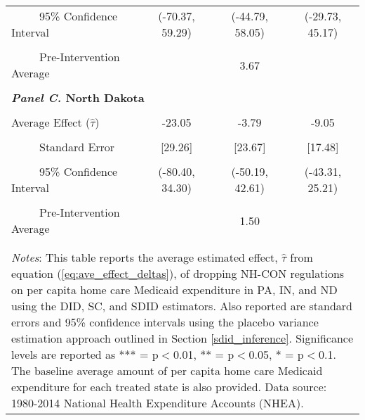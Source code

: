 \documentclass[12pt]{article}
\begin{document}
\begin{table}[htbp]
\begin{tabular}{l*{3}{c}}
\\[-2ex]
\multicolumn{1}{l}{\ \ \ \ \ 95\% Confidence Interval}&   \multicolumn{1}{c}{(-70.37, 59.29)}&   \multicolumn{1}{c}{(-44.79, 58.05)}&   \multicolumn{1}{c}{(-29.73, 45.17)}\\
\\[-2ex]
\multicolumn{1}{l}{\ \ \ \ \ Pre-Intervention Average}&   \multicolumn{3}{c}{3.67}\\
\\[-.1ex]
\multicolumn{4}{l}{\textbf{\textit{Panel C.} North Dakota}}\\
\\[-1.5ex]
\multicolumn{1}{l}{Average Effect ($\hat{\tau}$)}&   \multicolumn{1}{c}{-23.05} &   \multicolumn{1}{c}{-3.79}&  \multicolumn{1}{c}{-9.05}\\
\\[-2ex]
\multicolumn{1}{l}{\ \ \ \ \ Standard Error}  &\multicolumn{1}{c}{[29.26]}&\multicolumn{1}{c}{[23.67]}&\multicolumn{1}{c}{[17.48]}\\
\\[-2ex]
\multicolumn{1}{l}{\ \ \ \ \ 95\% Confidence Interval}&   \multicolumn{1}{c}{(-80.40, 34.30)}&   \multicolumn{1}{c}{(-50.19, 42.61)}&   \multicolumn{1}{c}{(-43.31, 25.21)}\\
\\[-2ex]
\multicolumn{1}{l}{\ \ \ \ \ Pre-Intervention Average}&   \multicolumn{3}{c}{1.50}\\
\\[-.1ex]
\hline\hline
\\[-2ex]
\multicolumn{4}{p{.8\linewidth}}{\footnotesize \textit{Notes}: This table reports the average estimated effect, $\hat{\tau}$ from equation (\ref{eq:ave_effect_deltas}), of dropping NH-CON regulations on per capita home care Medicaid expenditure in PA, IN, and ND using the DID, SC, and SDID estimators. Also reported are standard errors and 95\% confidence intervals using the placebo variance estimation approach outlined in Section \ref{sdid_inference}. Significance levels are reported as *** = p$<$0.01, ** = p$<$0.05, * = p$<$0.1. The baseline average amount of per capita home care Medicaid expenditure for each treated state is also provided. Data source: 1980-2014 National Health Expenditure Accounts (NHEA).}
\end{tabular}
\end{table}
\vfill
\end{document}
